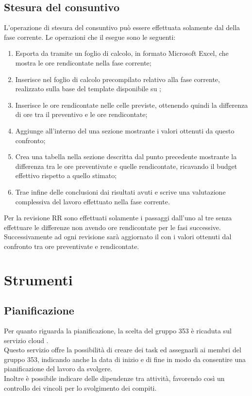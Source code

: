 \documentclass[NormeDiProgetto.tex]{subfiles}
\begin{document}
	\subsection{Stesura del consuntivo}
	L'operazione di stesura del consuntivo può essere effettuata solamente dal \respdiprog{} della fase corrente.
	Le operazioni che il \respdiprog{} esegue sono le seguenti:
	\begin{enumerate}
		\item Esporta da  tramite  un foglio di calcolo, in formato Microsoft Excel, che mostra le ore rendicontate nella fase corrente;
		\item Inserisce nel foglio di calcolo precompilato relativo alla fase corrente, realizzato sulla base del template disponibile su ;
		\item Inserisce le ore rendicontate nelle celle previste, ottenendo quindi la differenza di ore tra il preventivo e le ore rendicontate;
		\item Aggiunge all'interno del \pdp{} una sezione mostrante i valori ottenuti da questo confronto;
		\item Crea una tabella nella sezione descritta dal punto precedente mostrante la differenza tra le ore preventivate e quelle rendicontate, ricavando il budget effettivo rispetto a quello stimato;
		\item Trae infine delle conclusioni dai risultati avuti e scrive una valutazione complessiva del lavoro effettuato nella fase corrente.
	\end{enumerate}
	Per la revisione RR sono effettuati solamente i passaggi dall'uno al tre senza effettuare le differenze non avendo ore rendicontate per le fasi successive. Successivamente ad ogni revisione sarà aggiornato il \pdp{} con i valori ottenuti dal confronto tra ore preventivate e rendicontate. 
	
	\section{Strumenti}	
	\subsection{Pianificazione} Per quanto riguarda la pianificazione, la scelta del gruppo 353 è ricaduta sul servizio cloud .\\
	Questo servizio offre la possibilità di creare dei task ed assegnarli ai membri del gruppo 353, indicando anche la data di inizio e di fine in modo da consentire una pianificazione del lavoro da svolgere.\\
	Inoltre è possibile indicare delle dipendenze tra attività, favorendo così un controllo dei vincoli per lo svolgimento dei compiti.\\
	
\end{document}
